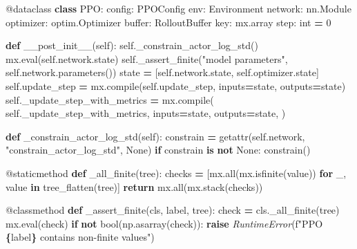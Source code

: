 \documentclass[
  american,
  11pt,
  letterpaper,
]{article}
\newenvironment{Shaded}{\begin{snugshade}}{\end{snugshade}}
\newcommand{\AttributeTok}[1]{\textcolor[rgb]{0.13,0.29,0.53}{#1}}
\newcommand{\BuiltInTok}[1]{#1}
\newcommand{\ControlFlowTok}[1]{\textcolor[rgb]{0.13,0.29,0.53}{\textbf{#1}}}
\newcommand{\DecValTok}[1]{\textcolor[rgb]{0.00,0.00,0.81}{#1}}
\newcommand{\KeywordTok}[1]{\textcolor[rgb]{0.13,0.29,0.53}{\textbf{#1}}}
\newcommand{\NormalTok}[1]{#1}
\newcommand{\OperatorTok}[1]{\textcolor[rgb]{0.81,0.36,0.00}{\textbf{#1}}}
\newcommand{\PreprocessorTok}[1]{\textcolor[rgb]{0.56,0.35,0.01}{\textit{#1}}}
\newcommand{\SpecialCharTok}[1]{\textcolor[rgb]{0.81,0.36,0.00}{\textbf{#1}}}
\newcommand{\SpecialStringTok}[1]{\textcolor[rgb]{0.31,0.60,0.02}{#1}}
\newcommand{\StringTok}[1]{\textcolor[rgb]{0.31,0.60,0.02}{#1}}
\newcommand{\VariableTok}[1]{\textcolor[rgb]{0.00,0.00,0.00}{#1}}
\renewenvironment{Shaded}{\par\smallskip}{\par\smallskip}
\begin{document}
\begin{Shaded}
\begin{Highlighting}[]
\AttributeTok{@dataclass}
\KeywordTok{class}\NormalTok{ PPO:}
\NormalTok{    config: PPOConfig}
\NormalTok{    env: Environment}
\NormalTok{    network: nn.Module}
\NormalTok{    optimizer: optim.Optimizer}
    \BuiltInTok{buffer}\NormalTok{: RolloutBuffer}
\NormalTok{    key: mx.array}
\NormalTok{    step: }\BuiltInTok{int} \OperatorTok{=} \DecValTok{0}

    \KeywordTok{def}\NormalTok{ \_\_post\_init\_\_(}\VariableTok{self}\NormalTok{):}
        \VariableTok{self}\NormalTok{.\_constrain\_actor\_log\_std()}
\NormalTok{        mx.}\BuiltInTok{eval}\NormalTok{(}\VariableTok{self}\NormalTok{.network.state)}
        \VariableTok{self}\NormalTok{.\_assert\_finite(}\StringTok{"model parameters"}\NormalTok{, }\VariableTok{self}\NormalTok{.network.parameters())}
\NormalTok{        state }\OperatorTok{=}\NormalTok{ [}\VariableTok{self}\NormalTok{.network.state, }\VariableTok{self}\NormalTok{.optimizer.state]}
        \VariableTok{self}\NormalTok{.update\_step }\OperatorTok{=}\NormalTok{ mx.}\BuiltInTok{compile}\NormalTok{(}\VariableTok{self}\NormalTok{.update\_step, inputs}\OperatorTok{=}\NormalTok{state, outputs}\OperatorTok{=}\NormalTok{state)}
        \VariableTok{self}\NormalTok{.\_update\_step\_with\_metrics }\OperatorTok{=}\NormalTok{ mx.}\BuiltInTok{compile}\NormalTok{(}
            \VariableTok{self}\NormalTok{.\_update\_step\_with\_metrics,}
\NormalTok{            inputs}\OperatorTok{=}\NormalTok{state,}
\NormalTok{            outputs}\OperatorTok{=}\NormalTok{state,}
\NormalTok{        )}

    \KeywordTok{def}\NormalTok{ \_constrain\_actor\_log\_std(}\VariableTok{self}\NormalTok{):}
\NormalTok{        constrain }\OperatorTok{=} \BuiltInTok{getattr}\NormalTok{(}\VariableTok{self}\NormalTok{.network, }\StringTok{"constrain\_actor\_log\_std"}\NormalTok{, }\VariableTok{None}\NormalTok{)}
        \ControlFlowTok{if}\NormalTok{ constrain }\KeywordTok{is} \KeywordTok{not} \VariableTok{None}\NormalTok{:}
\NormalTok{            constrain()}

    \AttributeTok{@staticmethod}
    \KeywordTok{def}\NormalTok{ \_all\_finite(tree):}
\NormalTok{        checks }\OperatorTok{=}\NormalTok{ [mx.}\BuiltInTok{all}\NormalTok{(mx.isfinite(value)) }\ControlFlowTok{for}\NormalTok{ \_, value }\KeywordTok{in}\NormalTok{ tree\_flatten(tree)]}
        \ControlFlowTok{return}\NormalTok{ mx.}\BuiltInTok{all}\NormalTok{(mx.stack(checks))}

    \AttributeTok{@classmethod}
    \KeywordTok{def}\NormalTok{ \_assert\_finite(cls, label, tree):}
\NormalTok{        check }\OperatorTok{=}\NormalTok{ cls.\_all\_finite(tree)}
\NormalTok{        mx.}\BuiltInTok{eval}\NormalTok{(check)}
        \ControlFlowTok{if} \KeywordTok{not} \BuiltInTok{bool}\NormalTok{(np.asarray(check)):}
            \ControlFlowTok{raise} \PreprocessorTok{RuntimeError}\NormalTok{(}\SpecialStringTok{f"PPO }\SpecialCharTok{\{}\NormalTok{label}\SpecialCharTok{\}}\SpecialStringTok{ contains non{-}finite values"}\NormalTok{)}


\end{Highlighting}
\end{Shaded}
\end{document}
